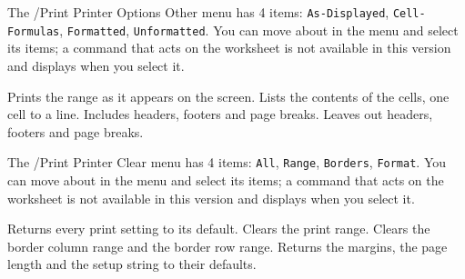 The /Print Printer Options Other menu has 4 items: \texttt{As-Displayed}, \texttt{Cell-Formulas}, \texttt{Formatted}, \texttt{Unformatted}.  You can move about in the menu and select its items; a command that acts on the worksheet is not available in this version and displays  when you select it.
\begin{Options}
 Prints the range as it appears on the screen.
 Lists the contents of the cells, one cell to a line.
 Includes headers, footers and page breaks.
 Leaves out headers, footers and page breaks.
\end{Options}

The /Print Printer Clear menu has 4 items: \texttt{All}, \texttt{Range}, \texttt{Borders}, \texttt{Format}.  You can move about in the menu and select its items; a command that acts on the worksheet is not available in this version and displays  when you select it.
\begin{Options}
 Returns every print setting to its default.
 Clears the print range.
 Clears the border column range and the border row range.
 Returns the margins, the page length and the setup string to their defaults.
\end{Options}

